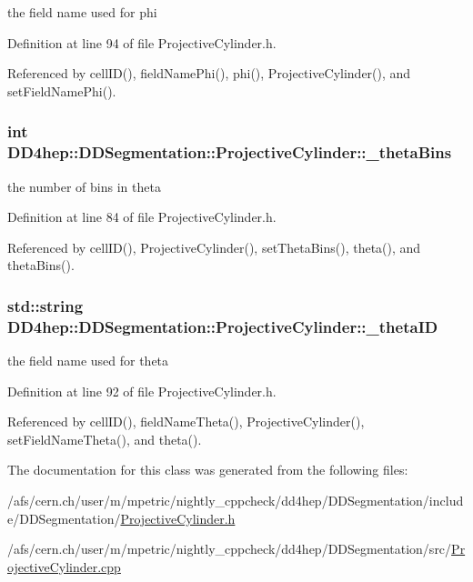 the field name used for phi 

Definition at line 94 of file ProjectiveCylinder.h.

Referenced by cellID(), fieldNamePhi(), phi(), ProjectiveCylinder(), and setFieldNamePhi().\hypertarget{class_d_d4hep_1_1_d_d_segmentation_1_1_projective_cylinder_a3a9abd6b200a4093f80607c63cb60a27}{
\subsubsection[{\_\-thetaBins}]{\setlength{\rightskip}{0pt plus 5cm}int {\bf DD4hep::DDSegmentation::ProjectiveCylinder::\_\-thetaBins}}}
\label{class_d_d4hep_1_1_d_d_segmentation_1_1_projective_cylinder_a3a9abd6b200a4093f80607c63cb60a27}


the number of bins in theta 

Definition at line 84 of file ProjectiveCylinder.h.

Referenced by cellID(), ProjectiveCylinder(), setThetaBins(), theta(), and thetaBins().\hypertarget{class_d_d4hep_1_1_d_d_segmentation_1_1_projective_cylinder_aa236579151e799c5aee4526a2fbbbdb2}{
\subsubsection[{\_\-thetaID}]{\setlength{\rightskip}{0pt plus 5cm}std::string {\bf DD4hep::DDSegmentation::ProjectiveCylinder::\_\-thetaID}}}
\label{class_d_d4hep_1_1_d_d_segmentation_1_1_projective_cylinder_aa236579151e799c5aee4526a2fbbbdb2}


the field name used for theta 

Definition at line 92 of file ProjectiveCylinder.h.

Referenced by cellID(), fieldNameTheta(), ProjectiveCylinder(), setFieldNameTheta(), and theta().

The documentation for this class was generated from the following files:\begin{DoxyCompactItemize}
\item 
/afs/cern.ch/user/m/mpetric/nightly\_\-cppcheck/dd4hep/DDSegmentation/include/DDSegmentation/\hyperlink{_projective_cylinder_8h}{ProjectiveCylinder.h}\item 
/afs/cern.ch/user/m/mpetric/nightly\_\-cppcheck/dd4hep/DDSegmentation/src/\hyperlink{_projective_cylinder_8cpp}{ProjectiveCylinder.cpp}\end{DoxyCompactItemize}
